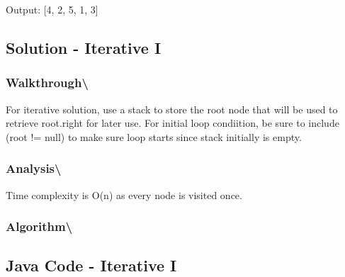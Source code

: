 \documentclass[]{book}
\begin{document}
Output: {[}4, 2, 5, 1, 3{]}

\hypertarget{solution---iterative-i-1}{%
\subsection{Solution - Iterative I}\label{solution---iterative-i-1}}

\hypertarget{walkthrough-69}{%
\subsubsection{Walkthrough\textbackslash{}}\label{walkthrough-69}}

For iterative solution, use a stack to store the root node that will be used to retrieve root.right for later use. For
initial loop condiition, be sure to include (root != null) to make sure loop starts since stack initially is empty.

\hypertarget{analysis-76}{%
\subsubsection{Analysis\textbackslash{}}\label{analysis-76}}

Time complexity is O(n) as every node is visited once.

\hypertarget{algorithm-77}{%
\subsubsection{Algorithm\textbackslash{}}\label{algorithm-77}}

\hypertarget{java-code---iterative-i-1}{%
\subsection{Java Code - Iterative I}\label{java-code---iterative-i-1}}
\end{document}
